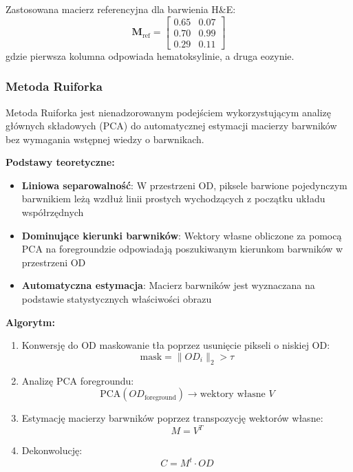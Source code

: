 \documentclass{article}
\begin{document}
Zastosowana macierz referencyjna dla barwienia H\&E:
\begin{equation}
\mathbf{M}_{\text{ref}} = \begin{bmatrix}
0.65 & 0.07 \\
0.70 & 0.99 \\
0.29 & 0.11
\end{bmatrix}
\end{equation}
gdzie pierwsza kolumna odpowiada hematoksylinie, a druga eozynie.

\subsubsection{Metoda Ruiforka}

Metoda Ruiforka jest nienadzorowanym podejściem wykorzystującym analizę głównych składowych (PCA) do automatycznej estymacji macierzy barwników bez wymagania wstępnej wiedzy o barwnikach.

\textbf{Podstawy teoretyczne:}
\begin{itemize}
    \item \textbf{Liniowa separowalność}: W przestrzeni OD, piksele barwione pojedynczym barwnikiem leżą wzdłuż linii prostych wychodzących z początku układu współrzędnych
    \item \textbf{Dominujące kierunki barwników}: Wektory własne obliczone za pomocą PCA na foregroundzie odpowiadają poszukiwanym kierunkom barwników w przestrzeni OD
    \item \textbf{Automatyczna estymacja}: Macierz barwników jest wyznaczana na podstawie statystycznych właściwości obrazu
\end{itemize}

\textbf{Algorytm:}
\begin{enumerate}
    \item Konwersję do OD maskowanie tła poprzez usunięcie pikseli o niskiej OD:
    \begin{equation}
        \text{mask} = \|OD_i\|_2 > \tau
    \end{equation}
    \item Analizę PCA foregroundu:
    \begin{equation}
        \text{PCA}(OD_{\text{foreground}}) \rightarrow \text{wektory własne } V
    \end{equation}
    \item Estymację macierzy barwników poprzez transpozycję wektorów własne:
    \begin{equation}
        M = V^T
    \end{equation}
    \item Dekonwolucję:
    \begin{equation}
        C = M^{t} \cdot OD
    \end{equation}
\end{enumerate}
\end{document}
